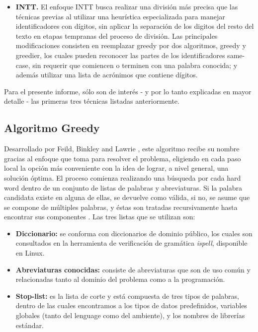 \begin{itemize}
  \item \textbf{INTT.} El enfoque INTT busca realizar una división más precisa que las técnicas previas al utilizar una heurística especializada para manejar identificadores con dígitos, sin aplicar la separación de los digitos del resto del texto en etapas tempranas del proceso de división. Las principales modificaciones consisten en reemplazar greedy por dos algoritmos, greedy y greedier, los cuales pueden reconocer las partes de los identificadores same-case, sin requerir que comiencen o terminen con una palabra conocida; y además utilizar una lista de acrónimos que contiene dígitos.
\end{itemize}

Para el presente informe, sólo son de interés - y por lo tanto explicadas en mayor detalle - las primeras tres técnicas listadas anteriormente.

\subsection{Algoritmo Greedy}
Desarrollado por Feild, Binkley and Lawrie \cite{FieldBinkleyLawrie06, Feild06anempirical, Lawrie2007, Lawrie:2007:EMA:1306878.1307350, EnslenHillPollock09}, este algoritmo recibe su nombre gracias al enfoque que toma para resolver el problema, eligiendo en cada paso local la opción más conveniente con la idea de lograr, a nivel general, una solución óptima. El proceso comienza realizando una búsqueda por cada hard word dentro de un conjunto de listas de palabras y abreviaturas. Si la palabra candidata existe en alguna de ellas, se devuelve como válida, si no, se asume que se compone de múltiples palabras, y éstas son tratadas recursivamente hasta encontrar sus componentes \cite{Feild06anempirical}. Las tres listas que se utilizan son:

\begin{itemize}
  \item \textbf{Diccionario:} se conforma con diccionarios de dominio público, los cuales son consultados en la herramienta de verificación de gramática \textit{ispell}, disponible en Linux.
  
  \item \textbf{Abreviaturas conocidas:} consiste de abreviaturas que son de uso común y relacionadas tanto al dominio del problema como a la programación.
  
  \item \textbf{Stop-list:} es la lista de corte y está compuesta de tres tipos de palabras, dentro de las cuales encontramos a los tipos de datos predefinidos, variables globales (tanto del lenguage como del ambiente), y los nombres de librerías estándar.
\end{itemize}

